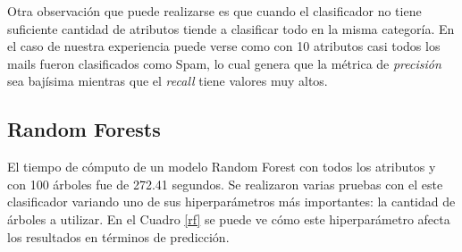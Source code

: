 \documentclass[10pt,a4paper]{article}
\begin{document}
Otra observación que puede realizarse es que cuando el clasificador no tiene suficiente cantidad de atributos tiende a clasificar todo en la misma categoría. En el caso de nuestra experiencia puede verse como con 10 atributos casi todos los mails fueron clasificados como Spam, lo cual genera que la métrica de \textit{precisión} sea bajísima mientras que el \textit{recall} tiene valores muy altos.


\subsection{Random Forests}

El tiempo de cómputo de un modelo Random Forest con todos los atributos y con 100 árboles fue de 272.41 segundos. Se realizaron varias pruebas con el este clasificador variando uno de sus hiperparámetros más importantes: la cantidad de árboles a utilizar. En el Cuadro \ref{rf} se puede ve cómo este hiperparámetro afecta los resultados en términos de predicción.
\end{document}
